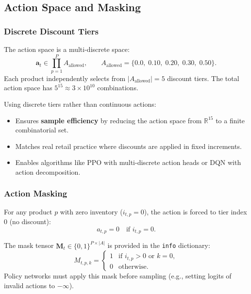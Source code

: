 \documentclass[11pt,a4paper]{article}
\begin{document}
\subsection{Action Space and Masking}

\subsubsection{Discrete Discount Tiers}

The action space is a multi-discrete space:
\begin{equation}
\mathbf{a}_t \in \prod_{p=1}^{P} A_{\text{allowed}}, \qquad A_{\text{allowed}} = \{0.0,\; 0.10,\; 0.20,\; 0.30,\; 0.50\}.
\end{equation}
Each product independently selects from $|A_{\text{allowed}}| = 5$ discount tiers.
The total action space has $5^{15} \approx 3 \times 10^{10}$ combinations.

Using discrete tiers rather than continuous actions:
\begin{itemize}
    \item Ensures \textbf{sample efficiency} by reducing the action space from $\mathbb{R}^{15}$ to a finite combinatorial set.
    \item Matches real retail practice where discounts are applied in fixed increments.
    \item Enables algorithms like PPO with multi-discrete action heads or DQN with action decomposition.
\end{itemize}

\subsubsection{Action Masking}

For any product $p$ with zero inventory ($i_{t,p} = 0$), the action is forced to tier index 0 (no discount):
\begin{equation}
a_{t,p} = 0 \quad \text{if } i_{t,p} = 0.
\end{equation}

The mask tensor $\mathbf{M}_t \in \{0, 1\}^{P \times |A|}$ is provided in the \texttt{info} dictionary:
\begin{equation}
M_{t,p,k} = \begin{cases}
1 & \text{if } i_{t,p} > 0 \text{ or } k = 0, \\
0 & \text{otherwise}.
\end{cases}
\end{equation}
Policy networks must apply this mask before sampling (e.g., setting logits of invalid actions to $-\infty$).
\end{document}
